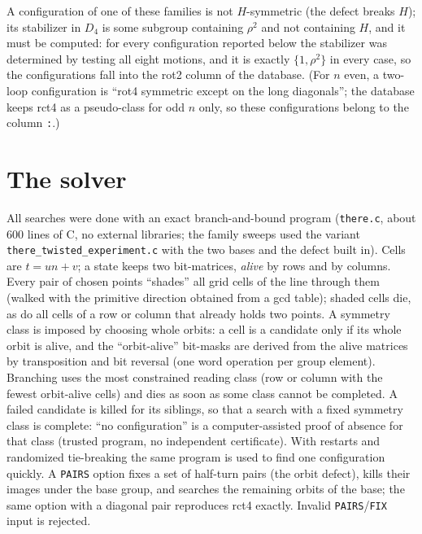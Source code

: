 \documentclass[11pt]{article}
\theoremstyle{remark}
\newcommand{\rot}{\rho}
\newcommand{\Dfour}{D_4}
\begin{document}
A configuration of one of these families is not $H$-symmetric (the defect breaks $H$); its stabilizer in $\Dfour$ is some
subgroup containing $\rot^2$ and not containing $H$, and it must be computed: for every configuration reported below the
stabilizer was determined by testing all eight motions, and it is exactly $\{1,\rot^2\}$ in every case, so the configurations
fall into the rot2 column of the database.  (For $n$ even, a two-loop configuration is ``rot4 symmetric except on the long
diagonals''; the database keeps rct4 as a pseudo-class for odd $n$ only, so these configurations belong to the column
\texttt{:}.)

\section{The solver}\label{sec:solver}
All searches were done with an exact branch-and-bound program (\texttt{there.c}, about 600 lines of C, no external
libraries; the family sweeps used the variant \texttt{there\_twisted\_experiment.c} with the two bases and the defect built
in).  Cells are $t=un+v$; a state keeps two bit-matrices, \emph{alive} by rows and by columns.  Every pair of chosen
points ``shades'' all grid cells of the line through them (walked with the primitive direction obtained from a gcd table);
shaded cells die, as do all cells of a row or column that already holds two points.  A symmetry class is imposed by choosing
whole orbits: a cell is a candidate only if its whole orbit is alive, and the ``orbit-alive'' bit-masks are derived from the
alive matrices by transposition and bit reversal (one word operation per group element).  Branching uses the most constrained
reading class (row or column with the fewest orbit-alive cells) and dies as soon as some class cannot be completed.  A failed
candidate is killed for its siblings, so that a search with a fixed symmetry class is complete: ``no configuration'' is a
computer-assisted proof of absence for that class (trusted program, no independent certificate).  With restarts and randomized
tie-breaking the same program is used to find one configuration quickly.  A \texttt{PAIRS} option fixes a set of half-turn
pairs (the orbit defect), kills their images under the base group, and searches the remaining orbits of the base; the same
option with a diagonal pair reproduces rct4 exactly.  Invalid \texttt{PAIRS}/\texttt{FIX} input is rejected.
\end{document}
